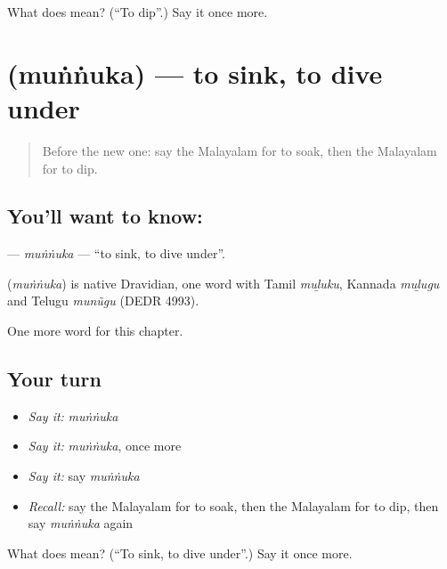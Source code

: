 \begin{tcolorbox}[breakable,colback=teal!4,colframe=teal!35!black,title={Before you move on}]
What does  mean? (\textquotedblleft{}To dip\textquotedblright{}.) Say it once more.
\end{tcolorbox}
\section[\texorpdfstring{\ml{മുങ്ങുക} (muṅṅuka)}{മുങ്ങുക (muṅṅuka)}]{ (muṅṅuka) — to sink, to dive under}

\label{lesson:ML-C232-munnuka}



\begin{quote}
Before the new one: say the Malayalam for to soak, then the Malayalam for to dip.
\end{quote}

\subsection*{You'll want to know: }
\textbf{} — \emph{muṅṅuka} — \textquotedblleft{}to sink, to dive under\textquotedblright{}.

\begin{cousinweb}
\textbf{} (\emph{muṅṅuka}) is native Dravidian, one word with Tamil \emph{muḻuku}, Kannada \emph{muḻugu} and Telugu \emph{munũgu} (DEDR 4993).
\end{cousinweb}

\begin{grammarlens}[title={What you've built}]
One more word for this chapter.
\end{grammarlens}

\subsection*{Your turn}
\begin{itemize}
\raggedright
  \item \emph{Say it:} \emph{muṅṅuka}
  \item \emph{Say it:} \emph{muṅṅuka}, once more
  \item \emph{Say it:} say \emph{muṅṅuka}
  \item \emph{Recall:} say the Malayalam for to soak, then the Malayalam for to dip, then say \emph{muṅṅuka} again
\end{itemize}

\begin{tcolorbox}[breakable,colback=teal!4,colframe=teal!35!black,title={Before you move on}]
What does  mean? (\textquotedblleft{}To sink, to dive under\textquotedblright{}.) Say it once more.
\end{tcolorbox}
